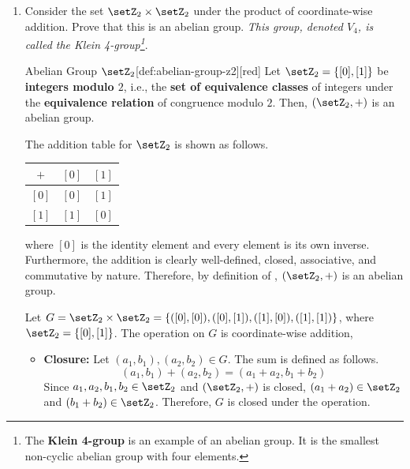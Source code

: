 \begin{enumerate} 
  \item Consider the set $\setZ_2 \times \setZ_2$ under the product 
  of coordinate-wise addition. Prove that this is an abelian group. 
  \textit{This group, denoted $V_4$, is called the Klein 4-group\footnote{
    The \textbf{Klein 4-group} is an example of an abelian group. 
    It is the smallest non-cyclic abelian group with four elements.
  }}.
  \begin{define}{Abelian Group $\setZ_2$}[def:abelian-group-z2][red]
    Let $\setZ_2=\{[0],[1]\}$ be \textbf{integers modulo $2$}, 
    i.e., the \textbf{set of equivalence classes} of integers under 
    the \textbf{equivalence relation} of congruence modulo $2$.
    Then, $(\setZ_2, +)$ is an abelian group.
    \begin{subprove}
      The addition table for $\setZ_2$ is shown as follows.
      \begin{center}
        \renewcommand{\arraystretch}{1.2}%
        \begin{tabular}{|c||c|c|}
        \hline
        $+$ & $[0]$ & $[1]$ \\
        \hline\hline
        $[0]$ & $[0]$ & $[1]$ \\
        \hline
        $[1]$ & $[1]$ & $[0]$ \\
        \hline
        \end{tabular}
      \end{center}
      where $[0]$ is the identity element and every element is its own inverse.
      Furthermore, the addition is clearly well-defined, closed, associative, and commutative by nature.
      Therefore, by definition of , $(\setZ_2, +)$ is an abelian group.
    \end{subprove}
  \end{define}
  \begin{subprove}
    Let $G = \setZ_2 \times \setZ_2 = \{([0],[0]), ([0],[1]), ([1],[0]), ([1],[1])\}$, 
    where $\setZ_2 = \{[0], [1]\}$. 
    The operation on $G$ is coordinate-wise addition, 
    \begin{itemize}
      \item \textbf{Closure:} 
        Let $(a_1, b_1),(a_2, b_2)\in G$. 
        The sum is defined as follows.
        \[
          (a_1, b_1) + (a_2, b_2) = (a_1 + a_2, b_1 + b_2)
        \]
        Since $a_1, a_2, b_1, b_2 \in \setZ_2$ and $(\setZ_2, +)$ is closed, 
        $(a_1 + a_2) \in \setZ_2$ and $(b_1 + b_2) \in \setZ_2$.
        Therefore, $G$ is closed under the operation.

\end{itemize}
\end{subprove}
\end{enumerate}
